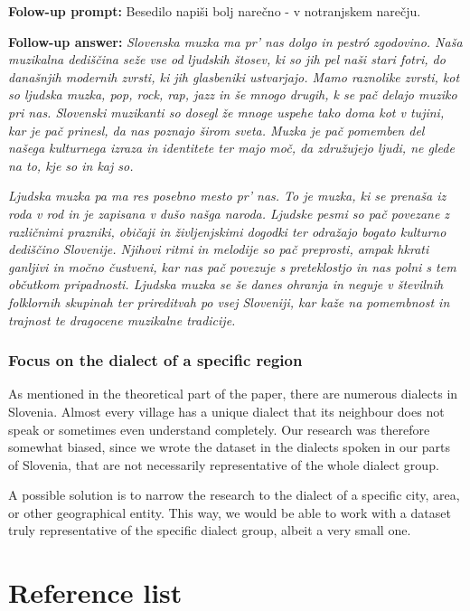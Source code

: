 \documentclass[fleqn,moreauthors,10pt]{ds_report}
\begin{document}
\textbf{Folow-up prompt:} 
Besedilo napiši bolj narečno - v notranjskem narečju.

\textbf{Follow-up answer:}
\textit{Slovenska muzka ma pr' nas dolgo in pestró zgodovino. Naša muzikalna dediščina seže vse od ljudskih štosev, ki so jih pel naši stari fotri, do današnjih modernih zvrsti, ki jih glasbeniki ustvarjajo. Mamo raznolike zvrsti, kot so ljudska muzka, pop, rock, rap, jazz in še mnogo drugih, k se pač delajo muziko pri nas. Slovenski muzikanti so dosegl že mnoge uspehe tako doma kot v tujini, kar je pač prinesl, da nas poznajo širom sveta. Muzka je pač pomemben del našega kulturnega izraza in identitete ter majo moč, da združujejo ljudi, ne glede na to, kje so in kaj so.}

\textit{Ljudska muzka pa ma res posebno mesto pr' nas. To je muzka, ki se prenaša iz roda v rod in je zapisana v dušo našga naroda. Ljudske pesmi so pač povezane z različnimi prazniki, običaji in življenjskimi dogodki ter odražajo bogato kulturno dediščino Slovenije. Njihovi ritmi in melodije so pač preprosti, ampak hkrati ganljivi in močno čustveni, kar nas pač povezuje s preteklostjo in nas polni s tem občutkom pripadnosti. Ljudska muzka se še danes ohranja in neguje v številnih folklornih skupinah ter prireditvah po vsej Sloveniji, kar kaže na pomembnost in trajnost te dragocene muzikalne tradicije.}

\subsubsection{Focus on the dialect of a specific region
}
As mentioned in the theoretical part of the paper, there are numerous dialects in Slovenia. Almost every village has a unique dialect that its neighbour does not speak or sometimes even understand completely. Our research was therefore somewhat biased, since we wrote the dataset in the dialects spoken in our parts of Slovenia, that are not necessarily representative of the whole dialect group.

A possible solution is to narrow the research to the dialect of a specific city, area, or other geographical entity. This way, we would be able to work with a dataset truly representative of the specific dialect group, albeit a very small one.

\section*{Reference list}
\end{document}
